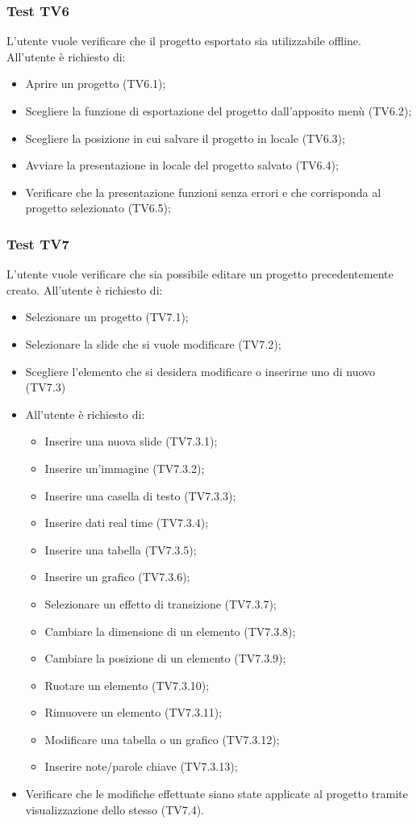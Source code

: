 \subsubsection{Test TV6}
L'utente vuole verificare che il progetto esportato sia utilizzabile offline. \newline
All'utente è richiesto di:
\begin{itemize}
	\item Aprire un progetto (TV6.1);
	\item Scegliere la funzione di esportazione del progetto dall'apposito menù (TV6.2);
	\item Scegliere la posizione in cui salvare il progetto in locale (TV6.3);
	\item Avviare la presentazione in locale del progetto salvato (TV6.4);
	\item Verificare che la presentazione funzioni senza errori e che corrisponda al progetto selezionato (TV6.5);
\end{itemize}

\subsubsection{Test TV7}
L'utente vuole verificare che sia possibile editare un progetto precedentemente creato. \newline
All'utente è richiesto di:
\begin{itemize}
	\item Selezionare un progetto (TV7.1);
	\item Selezionare la \gls{slide} che si vuole modificare (TV7.2);
	\item Scegliere l'elemento che si desidera modificare o inserirne uno di nuovo (TV7.3)
	\item[] All'utente è richiesto di:
	\begin{itemize}
		\item Inserire una nuova \gls{slide} (TV7.3.1);
		\item Inserire un'immagine (TV7.3.2);
		\item Inserire una casella di testo (TV7.3.3);
		\item Inserire dati \gls{real time} (TV7.3.4);
		\item Inserire una tabella (TV7.3.5);
		\item Inserire un grafico (TV7.3.6);
		\item Selezionare un effetto di transizione (TV7.3.7);
		\item Cambiare la dimensione di un elemento (TV7.3.8);
		\item Cambiare la posizione di un elemento (TV7.3.9);
		\item Ruotare un elemento (TV7.3.10);
		\item Rimuovere un elemento (TV7.3.11);
		\item Modificare una tabella o un grafico (TV7.3.12);
		\item Inserire note/parole chiave (TV7.3.13);
	\end{itemize}
	\item Verificare che le modifiche effettuate siano state applicate al progetto tramite visualizzazione dello stesso (TV7.4).
\end{itemize}

